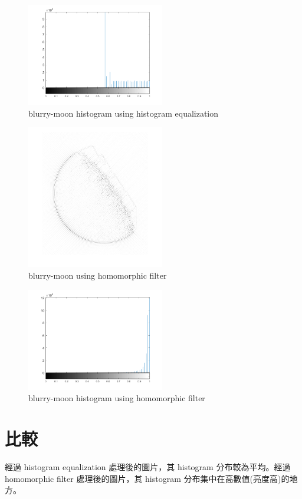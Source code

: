 \documentclass[conference]{IEEEtran}
\begin{document}
\begin{figure}[H]
\centerline{\includegraphics[width=6cm]{blurry-moon_histeq_hist.png}}
\caption{blurry-moon histogram using histogram equalization}
\label{blurry-moon_histeq_hist}
\end{figure}

\begin{figure}[H]
\centerline{\includegraphics[width=6cm]{blurry-moon_homo.png}}
\caption{blurry-moon using homomorphic filter}
\label{blurry-moon_homo}
\end{figure}


\begin{figure}[H]
\centerline{\includegraphics[width=6cm]{blurry-moon_homo_hist.png}}
\caption{blurry-moon histogram using homomorphic filter}
\label{blurry-moon_homo_hist}
\end{figure}


\section{比較}
經過 histogram equalization 處理後的圖片，其 histogram 分布較為平均。經過 homomorphic filter 處理後的圖片，其 histogram 分布集中在高數值(亮度高)的地方。


\vspace{12pt}
\end{document}
